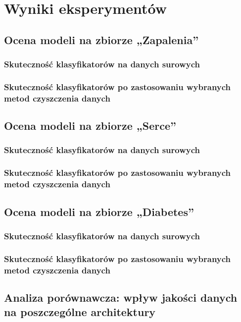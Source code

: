 \chapter{Wyniki eksperymentów}

{%

\section{Ocena modeli na zbiorze „Zapalenia”}
\subsection{Skuteczność klasyfikatorów na danych surowych}
\subsection{Skuteczność klasyfikatorów po zastosowaniu wybranych metod czyszczenia danych}
\section{Ocena modeli na zbiorze „Serce”}
\subsection{Skuteczność klasyfikatorów na danych surowych}
\subsection{Skuteczność klasyfikatorów po zastosowaniu wybranych metod czyszczenia danych}
\section{Ocena modeli na zbiorze „Diabetes”}
\subsection{Skuteczność klasyfikatorów na danych surowych}
\subsection{Skuteczność klasyfikatorów po zastosowaniu wybranych metod czyszczenia danych}
\section{Analiza porównawcza: wpływ jakości danych na poszczególne architektury}

}